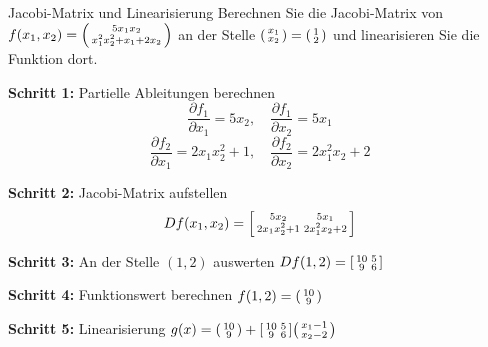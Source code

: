 \begin{example2}{Jacobi-Matrix und Linearisierung}
Berechnen Sie die Jacobi-Matrix von $f(x_1, x_2) = \begin{psmallmatrix} 5x_1 x_2 \\ x_1^2 x_2^2 + x_1 + 2x_2 \end{psmallmatrix}$ an der Stelle $\begin{psmallmatrix} x_1 \\ x_2 \end{psmallmatrix} = \begin{psmallmatrix} 1 \\ 2 \end{psmallmatrix}$ und linearisieren Sie die Funktion dort.

\textbf{Schritt 1:} Partielle Ableitungen berechnen
$$\frac{\partial f_1}{\partial x_1} = 5x_2, \quad \frac{\partial f_1}{\partial x_2} = 5x_1$$
$$\frac{\partial f_2}{\partial x_1} = 2x_1 x_2^2 + 1, \quad \frac{\partial f_2}{\partial x_2} = 2x_1^2 x_2 + 2$$

\textbf{Schritt 2:} Jacobi-Matrix aufstellen
$$Df(x_1, x_2) = \begin{bsmallmatrix} 5x_2 & 5x_1 \\ 2x_1 x_2^2 + 1 & 2x_1^2 x_2 + 2 \end{bsmallmatrix}$$

\textbf{Schritt 3:} An der Stelle $(1, 2)$ auswerten
$Df(1, 2) = \begin{bsmallmatrix} 10 & 5 \\ 9 & 6 \end{bsmallmatrix}$

\textbf{Schritt 4:} Funktionswert berechnen
$f(1, 2) = \begin{psmallmatrix} 10 \\ 9 \end{psmallmatrix}$

\textbf{Schritt 5:} Linearisierung
$g(x) = \begin{psmallmatrix} 10 \\ 9 \end{psmallmatrix} + \begin{bsmallmatrix} 10 & 5 \\ 9 & 6 \end{bsmallmatrix} \begin{psmallmatrix} x_1 - 1 \\ x_2 - 2 \end{psmallmatrix}$
\end{example2}



